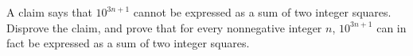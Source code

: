 A claim says that $10^{3n+1}$ cannot be expressed as a sum of two integer squares. Disprove the claim, and prove that for every nonnegative integer $n$, $10^{3n+1}$ can in fact be expressed as a sum of two integer squares.
